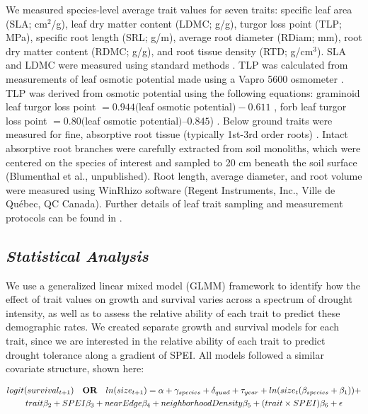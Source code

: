 \documentclass[12pt, letterpaper]{article}
\begin{document}
We measured species-level average trait values for seven traits: specific leaf area (SLA; cm$^2$/g), leaf dry matter content (LDMC; g/g), turgor loss point (TLP; MPa), specific root length (SRL; g/m), average root diameter (RDiam; mm), root dry matter content (RDMC; g/g), and root tissue density (RTD; g/cm$^3$). SLA and LDMC were measured using standard methods \citep{Perez-Harguindeguy2013}. TLP was calculated from measurements of leaf osmotic potential made using a Vapro 5600 osmometer \citep{Bartlett2012}. TLP was derived from osmotic potential using the following equations: graminoid leaf turgor loss point $= 0.944($leaf osmotic potential$) - 0.611$ , forb leaf turgor loss point $= 0.80($leaf osmotic potential$)–0.845$) \citep{ Griffin-Nolan2019}. Below ground traits were measured for fine, absorptive root tissue (typically 1st-3rd order roots) \citep{McCormack2015}. Intact absorptive root branches were carefully extracted from soil monoliths, which were centered on the species of interest and sampled to 20 cm beneath the soil surface (Blumenthal et al., unpublished). Root length, average diameter, and root volume were measured using WinRhizo software (Regent Instruments, Inc., Ville de Québec, QC Canada). Further details of leaf trait sampling and measurement protocols can be found in \cite{Blumenthal2020}.

\subsection{\textit{Statistical Analysis}} We use a generalized linear mixed model (GLMM) framework to identify how the effect of trait values on growth and survival varies across a spectrum of drought intensity, as well as to assess the relative ability of each trait to predict these demographic rates. We created separate growth and survival models for each trait, since we are interested in the relative ability of each trait to predict drought tolerance along a gradient of SPEI. All models followed a similar covariate structure, shown here:

\begin{multline}
\label{surv_eq}
logit(survival_{t+1})\quad \textbf{\text{OR}} \quad ln(size_{t+1}) = \alpha + \gamma_{species}+ \delta_{quad} + \tau_{year} + ln(size_t(\beta_{species}  + \beta_1)) +\\ trait\beta_2+ SPEI\beta_3 + nearEdge\beta_4  + neighborhoodDensity\beta_5 + (trait\times SPEI)\beta_6 + \epsilon
\end{multline}
\end{document}
